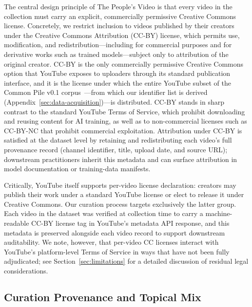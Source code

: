 \documentclass{article}
\begin{document}
The central design principle of The People's Video is that every video in the collection must carry an explicit, commercially permissive Creative Commons license. Concretely, we restrict inclusion to videos published by their creators under the Creative Commons Attribution (CC-BY) license, which permits use, modification, and redistribution---including for commercial purposes and for derivative works such as trained models---subject only to attribution of the original creator. CC-BY is the only commercially permissive Creative Commons option that YouTube exposes to uploaders through its standard publication interface, and it is the license under which the entire YouTube subset of the Common Pile v0.1 corpus~\cite{kandpal2025commonpile}---from which our identifier list is derived (Appendix~\ref{sec:data-acquisition})---is distributed. CC-BY stands in sharp contrast to the standard YouTube Terms of Service, which prohibit downloading and reusing content for AI training, as well as to non-commercial licenses such as CC-BY-NC that prohibit commercial exploitation. Attribution under CC-BY is satisfied at the dataset level by retaining and redistributing each video's full provenance record (channel identifier, title, upload date, and source URL); downstream practitioners inherit this metadata and can surface attribution in model documentation or training-data manifests.

Critically, YouTube itself supports per-video license declaration: creators may publish their work under a standard YouTube license or elect to release it under Creative Commons. Our curation process targets exclusively the latter group. Each video in the dataset was verified at collection time to carry a machine-readable CC-BY license tag in YouTube's metadata API response, and this metadata is preserved alongside each video record to support downstream auditability. We note, however, that per-video CC licenses interact with YouTube's platform-level Terms of Service in ways that have not been fully adjudicated; see Section~\ref{sec:limitations} for a detailed discussion of residual legal considerations.

\subsection{Curation Provenance and Topical Mix}
\end{document}
